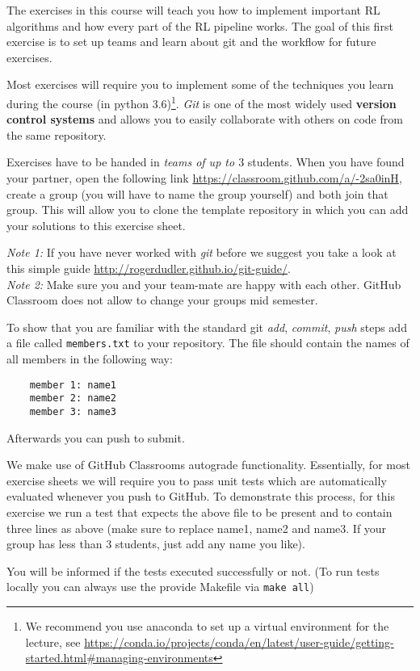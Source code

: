 \documentclass{exam}
\begin{document}
\noindent
The exercises in this course will teach you how to implement important RL algorithms and how every part of the RL pipeline works. The goal of this first exercise is to set up teams and learn about git and the workflow for future exercises.

\begin{questions}
	Most exercises will require you to implement some of the techniques you learn during the course (in python 3.6)\footnote{We recommend you use anaconda to set up a virtual environment for the lecture, see \url{https://conda.io/projects/conda/en/latest/user-guide/getting-started.html\#managing-environments}}.
	\emph{Git} is one of the most widely used \textbf{version control systems} and allows you to easily collaborate with others on code from the same repository.
	
    Exercises have to be handed in \emph{teams of up to $3$} students.
    When you have found your partner, open the following link \url{https://classroom.github.com/a/-2sa0inH}, create a group (you will have to name the group yourself) and both join that group.
    This will allow you to clone the template repository in which you can add your solutions to this exercise sheet.

    \emph{Note 1:} If you have never worked with \emph{git} before we suggest you take a look at this simple guide \url{http://rogerdudler.github.io/git-guide/}.\\
    \emph{Note 2:} Make sure you and your team-mate are happy with each other. GitHub Classroom does not allow to change your groups mid semester. 
    
	
	To show that you are familiar with the standard git \emph{add}, \emph{commit}, \emph{push} steps add a file called \texttt{members.txt} to your repository.
	The file should contain the names of all members in the following way:
	\begin{verbatim}
	member 1: name1
	member 2: name2
	member 3: name3
	\end{verbatim}
	Afterwards you can push to submit.
	
	We make use of GitHub Classrooms autograde functionality. Essentially, for most exercise sheets we will require you to pass unit tests which are automatically evaluated whenever you push to GitHub.
	To demonstrate this process, for this exercise we run a test that expects the above file to be present and to contain three lines as above (make sure to replace name1, name2 and name3. If your group has less than 3 students, just add any name you like).

	You will be informed if the tests executed successfully or not.
	(To run tests locally you can always use the provide Makefile via \texttt{make all})
\end{questions}
\end{document}
